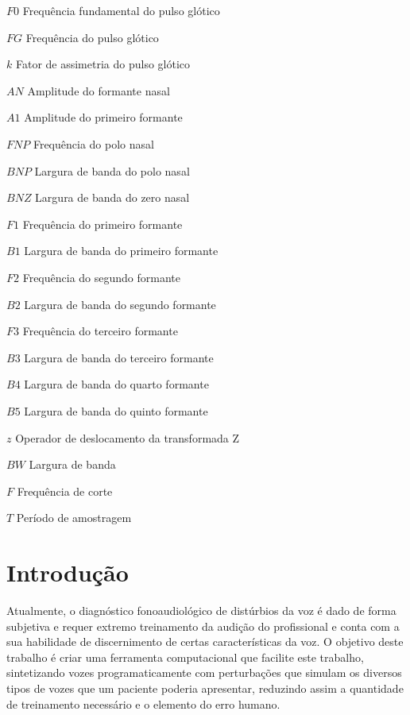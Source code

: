 \documentclass[
  12pt,       
  openright,      
  twoside,      
  a4paper,      
  english,      
  french,       
  spanish,      
  brazil,     
  ]{abntex2}
\begin{document}
\listoffigures*
\cleardoublepage

\listoftables*
\cleardoublepage

\begin{simbolos}
  \item[$ F0 $] Frequência fundamental do pulso glótico
  \item[$ FG $] Frequência do pulso glótico
  \item[$ k $] Fator de assimetria do pulso glótico
  \item[$ AN $] Amplitude do formante nasal
  \item[$ A1 $] Amplitude do primeiro formante
  \item[$ FNP $] Frequência do polo nasal
  \item[$ BNP $] Largura de banda do polo nasal
  \item[$ BNZ $] Largura de banda do zero nasal
  \item[$ F1 $] Frequência do primeiro formante
  \item[$ B1 $] Largura de banda do primeiro formante
  \item[$ F2 $] Frequência do segundo formante
  \item[$ B2 $] Largura de banda do segundo formante
  \item[$ F3 $] Frequência do terceiro formante
  \item[$ B3 $] Largura de banda do terceiro formante
  \item[$ B4 $] Largura de banda do quarto formante
  \item[$ B5 $] Largura de banda do quinto formante
  \item[$ z $] Operador de deslocamento da transformada Z
  \item[$ BW $] Largura de banda
  \item[$ F $] Frequência de corte
  \item[$ T $] Período de amostragem
\end{simbolos}

\tableofcontents*
\cleardoublepage

\textual

\chapter{Introdução}
Atualmente, o diagnóstico fonoaudiológico de distúrbios da voz é dado de forma subjetiva e requer extremo treinamento da audição do profissional e conta com a sua habilidade de discernimento de certas características da voz. O objetivo deste trabalho é criar uma ferramenta computacional que facilite este trabalho, sintetizando vozes programaticamente com perturbações que simulam os diversos tipos de vozes que um paciente poderia apresentar, reduzindo assim a quantidade de treinamento necessário e o elemento do erro humano.
\end{document}
